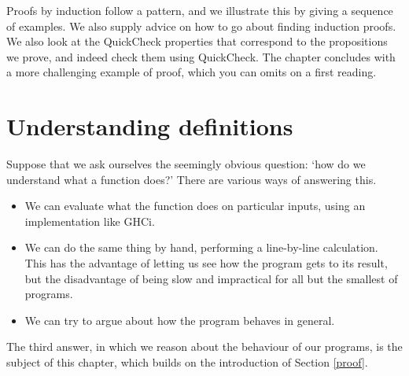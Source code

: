 Proofs by induction follow a pattern, and we illustrate this by giving a
sequence of examples. We also supply advice on how to go about finding
induction proofs. We also look at the QuickCheck properties that correspond to the propositions we prove, and indeed check them using QuickCheck.  The chapter concludes with a more challenging example
of proof, which you can omits on a first reading.

\begin{webvideos}
\end{webvideos}

\section{Understanding definitions}

Suppose that we ask ourselves the seemingly obvious question: `how
do we understand what a function does?' There are various ways
of answering this. 
\begin{itemize}
\item We can evaluate what the function does on particular inputs, using an
implementation like GHCi.
\item We can do the same thing by hand, performing a line-by-line
calculation. This has the advantage of letting us see how the program
gets to its result, but the disadvantage of being slow and impractical
for all but the smallest of programs.
\item We can try to argue about how the program behaves in general. 
\end{itemize}
The third answer, in which we reason about the behaviour of our
programs, is the subject of this chapter, which builds on the
introduction of Section \ref{proof}.

